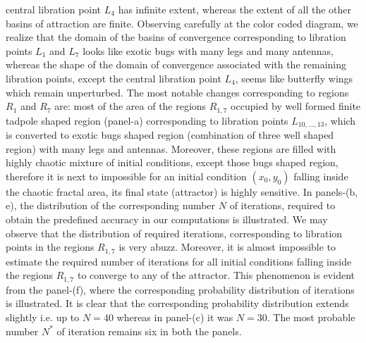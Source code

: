\documentclass[preprint,fleqn,5p,numbers,sort&compress]{elsarticle}
\begin{document}
central libration point $L_4$ has infinite extent, whereas the
extent of all the other basins of attraction are finite. Observing
carefully at the color coded diagram, we realize that
the domain of the basins of convergence corresponding to libration
points $L_1$ and $L_7$  looks like exotic bugs with many legs and many
antennas, whereas the shape of the domain of convergence associated
with the remaining libration points, except the central libration
point $L_4$, seems like butterfly wings which remain unperturbed.
The most notable changes corresponding to regions $R_1$ and $R_7$ are:
most of the area of the regions $R_{1,7}$ occupied by well formed finite
tadpole shaped region (panel-a) corresponding to libration points $L_{10,...,13}$, which is
converted to exotic bugs shaped region (combination of three well shaped
region) with many legs and antennas. Moreover, these regions are filled
with highly chaotic mixture of initial conditions, except those bugs shaped region, therefore
it is next to impossible for an
initial condition $(x_0, y_0)$ falling inside the chaotic fractal area,
its final state (attractor) is highly sensitive. In panels-(b, e), the distribution of the corresponding number $N$ of iterations, required to obtain the predefined accuracy in our computations is illustrated. We may observe that the distribution of required iterations, corresponding to libration points in the regions $R_{1, 7}$ is very abuzz. Moreover, it is almost impossible to estimate the required number of iterations for all initial conditions falling inside the regions $R_{1,7}$  to converge to any of the attractor. This phenomenon is evident from the panel-(f), where the corresponding probability distribution of iterations is illustrated. It is clear that the corresponding probability distribution extends slightly i.e. up to $N=40$  whereas in panel-(c) it was $N=30$. The most probable number $N^*$ of iteration remains six in both the panels.
\end{document}
